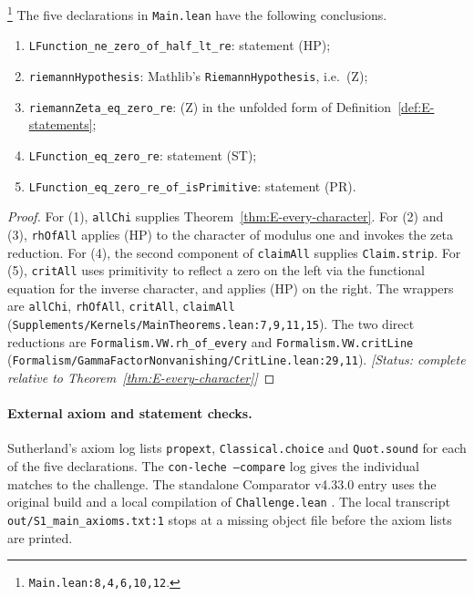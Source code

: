 \begin{theorem}\label{thm:E-main}
\footnote{\nolinkurl{Main.lean:8,4,6,10,12}.}%
The five declarations in \texttt{Main.lean} have the following conclusions.
\begin{enumerate}
\item \texttt{LFunction\_ne\_zero\_of\_half\_lt\_re}: statement \textup{(HP)};
\item \texttt{riemannHypothesis}: Mathlib's \texttt{RiemannHypothesis}, i.e.\ \textup{(Z)};
\item \texttt{riemannZeta\_eq\_zero\_re}: \textup{(Z)} in the unfolded form of
Definition~\ref{def:E-statements};
\item \texttt{LFunction\_eq\_zero\_re}: statement \textup{(ST)};
\item \texttt{LFunction\_eq\_zero\_re\_of\_isPrimitive}: statement \textup{(PR)}.
\end{enumerate}
\end{theorem}
\begin{proof}
For (1), \texttt{allChi} supplies Theorem~\ref{thm:E-every-character}. For (2) and (3),
\texttt{rhOfAll} applies (HP) to the character of modulus one and invokes the zeta reduction.
For (4), the second component of \texttt{claimAll} supplies \texttt{Claim.strip}. For (5),
\texttt{critAll} uses primitivity to reflect a zero on the left via the functional equation for the
inverse character, and applies (HP) on the right.
\label{r10:main-wrappers}The wrappers are \texttt{allChi}, \texttt{rhOfAll}, \texttt{critAll}, \texttt{claimAll}
(\nolinkurl{Supplements/Kernels/MainTheorems.lean:7,9,11,15}). The two direct reductions are
\texttt{Formalism.VW.rh\_of\_every} and \texttt{Formalism.VW.critLine}
(\nolinkurl{Formalism/GammaFactorNonvanishing/CritLine.lean:29,11}).
\textit{[Status: complete relative to Theorem~\ref{thm:E-every-character}]}
\end{proof}

\paragraph{External axiom and statement checks.}

Sutherland's axiom log lists \texttt{propext}, \texttt{Classical.choice} and \texttt{Quot.sound}
for each of the five declarations. The \texttt{con-leche --compare} log gives the
individual matches to the challenge. The standalone Comparator v4.33.0 entry uses
the original build and a local compilation of \texttt{Challenge.lean}
\cite{E-Sutherland,E-audit,E-compare}.
The local transcript \nolinkurl{out/S1_main_axioms.txt:1} stops at a missing object file before the
axiom lists are printed.

